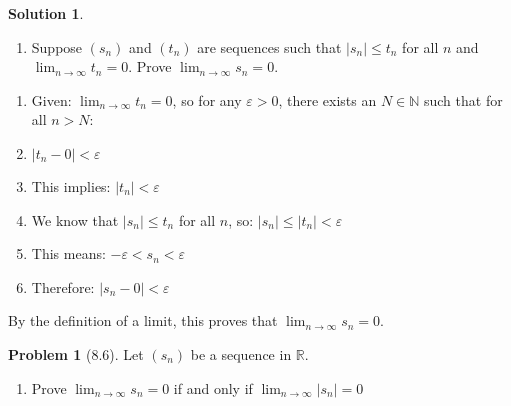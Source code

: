 \documentclass[12pt]{article}
\theoremstyle{definition} %
\newtheorem{solution}{Solution}
\newtheorem{problem}{Problem}
\theoremstyle{plain} %
\begin{document}
\begin{solution}
    \begin{enumerate}[resume]
        \item Suppose $(s_{n})$ and $(t_{n})$ are sequences such that $|s_{n}|\leq t_{n}$ for all $n$ and $\lim_{ n \to \infty }t_{n}=0$. Prove $\lim_{ n \to \infty }s_{n}=0$.
    \end{enumerate}
    \begin{enumerate}
        \item Given: $\lim_{n \to \infty} t_n = 0$, so for any $\varepsilon > 0$, there exists an $N \in \mathbb{N}$ such that for all $n > N$:
        \item $|t_n - 0| < \varepsilon$
        \item This implies: $|t_n| < \varepsilon$
        \item We know that $|s_n| \leq t_n$ for all $n$, so: $|s_n| \leq |t_n| < \varepsilon$
        \item This means: $-\varepsilon < s_n < \varepsilon$
        \item Therefore: $|s_n - 0| < \varepsilon$
    \end{enumerate}
    By the definition of a limit, this proves that $\lim_{n \to \infty} s_n = 0$. 
    
     
    \end{solution}


\begin{problem}[8.6]
    Let $(s_{n})$ be a sequence in $\mathbb{R}$.
\begin{enumerate}
    \item Prove $\lim_{ n \to \infty }s_{n}=0$ if and only if $\lim_{ n \to \infty }|s_{n}|=0$
\end{enumerate}

\end{problem}
\end{document}
